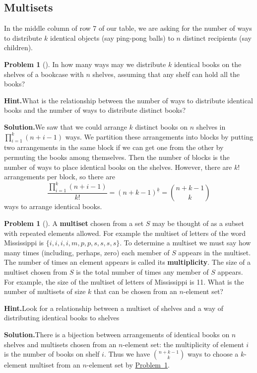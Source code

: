 \documentclass[10pt,]{book}
\newcommand{\terminology}[1]{\textbf{#1}}
\theoremstyle{plain}
\theoremstyle{definition}
\newtheorem{activity}[project]{Problem}
\theoremstyle{definition}
\numberwithin{equation}{chapter}
\begin{document}
\subsection[{Multisets}]{Multisets}\label{subsection-24}
In the middle column of row 7 of our table, we are asking for the number of ways to distribute \(k\) identical objects (say ping-pong balls) to \(n\) distinct recipients (say children).%
\begin{activity}[]\label{identicalbooks}
In how many ways may we distribute \(k\) identical books on the shelves of a bookcase with \(n\) shelves, assuming that any shelf can hold all the books?%
\par\medskip\noindent%
\textbf{Hint.}\quad What is the relationship between the number of ways to distribute identical books and the number of ways to distribute distinct books?%
\par\medskip\noindent%
\textbf{Solution.}\quad We saw that we could arrange \(k\) distinct books on \(n\) shelves in \(\prod_{i=1}^k (n+i-1)\) ways. We partition these arrangements into blocks by putting two arrangements in the same block if we can get one from the other by permuting the books among themselves. Then the number of blocks is the number of ways to place identical books on the shelves. However, there are \(k!\) arrangements per block, so there are%
\begin{equation*}
\frac{\prod_{i=1}^k (n+i-1)}{k!}=(n+k-1)^{\underline{k}}= \binom{n+k-1}{k}
\end{equation*}
ways to arrange identical books.%
\end{activity}
\begin{activity}[]\label{multiset}
A \terminology{multiset} chosen from a set \(S\) may be thought of as a subset with repeated elements allowed. For example the multiset of letters of the word Mississippi is \(\{i,i,i,i,m,p,p,s,s,s,s\}\). To determine a multiset we must say how many times (including, perhaps, zero) each member of \(S\) appears in the multiset. The number of times an element appears is called its \terminology{multiplicity}. The size of a multiset chosen from \(S\) is the total number of times any member of \(S\) appears. For example, the size of the multiset of letters of Mississippi is 11. What is the number of multisets of size \(k\) that can be chosen from an \(n\)-element set?%
\par\medskip\noindent%
\textbf{Hint.}\quad Look for a relationship between a multiset of shelves and a way of distributing identical books to shelves%
\par\medskip\noindent%
\textbf{Solution.}\quad There is a bijection between arrangements of identical books on \(n\) shelves and multisets chosen from an \(n\)-element set: the multiplicity of element \(i\) is the number of books on shelf \(i\). Thus we have \(\binom{n+k-1}{k}\) ways to choose a \(k\)-element multiset from an \(n\)-element set by \hyperref[identicalbooks]{Problem~\ref{identicalbooks}}.%
\end{activity}
\end{document}
